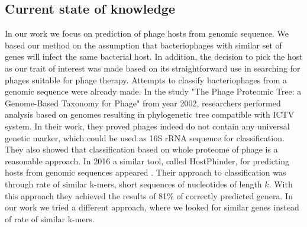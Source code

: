 \subsection{Current state of knowledge}
In our work we focus on prediction of phage hosts from genomic sequence.
We based our method on the assumption that bacteriophages with similar set of genes will infect the same bacterial host.
In addition, the decision to pick the host as our trait of interest was made based on its straightforward use in searching for phages suitable for phage therapy.
Attempts to classify bacteriophages from a genomic sequence were already made.
In the study "The Phage Proteomic Tree: a Genome-Based Taxonomy for Phage"\cite{phage} from year 2002, researchers performed analysis based on genomes resulting in phylogenetic tree compatible with ICTV system.
In their work, they proved phages indeed do not contain any universal genetic marker, which could be used as 16S rRNA sequence for classification.
They also showed that classification based on whole proteome of phage is a reasonable approach.
In 2016 a similar tool, called HostPhinder, for predicting hosts from genomic sequences appeared \cite{hostphinder}.
Their approach to classification was through rate of similar k-mers, short sequences of nucleotides of length $k$.
With this approach they achieved the results of 81\% of correctly predicted genera.
In our work we tried a different approach, where we looked for similar genes instead of rate of similar k-mers.

